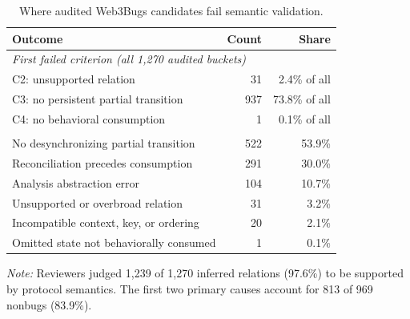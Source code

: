 \begin{table}
  \caption{Where audited Web3Bugs candidates fail semantic validation.}
  \label{tab:error-analysis}
  \centering
  \small
  \begin{tabularx}{\linewidth}{Xrr}
    \toprule
    Outcome & Count & Share \\
    \midrule
    \multicolumn{3}{l}{\emph{First failed criterion (all 1,270 audited buckets)}} \\
    C2: unsupported relation & 31 & 2.4\% of all \\
    C3: no persistent partial transition & 937 & 73.8\% of all \\
    C4: no behavioral consumption & 1 & 0.1\% of all \\
    \addlinespace
    \multicolumn{3}{l}{\emph{Primary cause (969 nonbugs)}} \\
    No desynchronizing partial transition & 522 & 53.9\% \\
    Reconciliation precedes consumption & 291 & 30.0\% \\
    Analysis abstraction error & 104 & 10.7\% \\
    Unsupported or overbroad relation & 31 & 3.2\% \\
    Incompatible context, key, or ordering & 20 & 2.1\% \\
    Omitted state not behaviorally consumed & 1 & 0.1\% \\
    \bottomrule
  \end{tabularx}
  \parbox{\linewidth}{\footnotesize\emph{Note:} Reviewers judged 1,239 of 1,270 inferred relations (97.6\%) to be supported by protocol semantics. The first two primary causes account for 813 of 969 nonbugs (83.9\%).}
\end{table}
